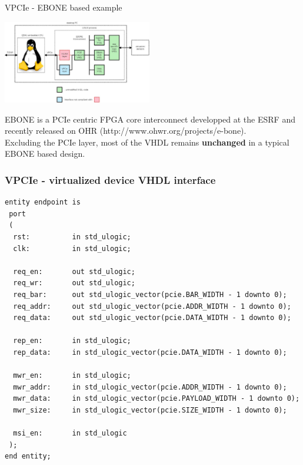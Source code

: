 \documentclass{beamer}
\begin{document}
\begin{frame}{VPCIe - EBONE based example}
  \begin{center}
    \includegraphics[width=65mm]{pic/dv_generic_platform_vpcie/main.jpeg}
  \end{center}
  \begin{tiny}
    EBONE is a PCIe centric FPGA core interconnect developped at the ESRF
    and recently released on OHR (http://www.ohwr.org/projects/e-bone).\\
    Excluding the PCIe layer, most of the VHDL remains \textbf{unchanged}
    in a typical EBONE based design.
  \end{tiny}
\end{frame}

\begin{frame}[containsverbatim]
 \frametitle{VPCIe - virtualized device VHDL interface}
 \begin{tiny}
 \lstset{language=VHDL}
 \begin{lstlisting}[frame=tb]
entity endpoint is
 port
 (
  rst:          in std_ulogic;
  clk:          in std_ulogic;

  req_en:       out std_ulogic;
  req_wr:       out std_ulogic;
  req_bar:      out std_ulogic_vector(pcie.BAR_WIDTH - 1 downto 0);
  req_addr:     out std_ulogic_vector(pcie.ADDR_WIDTH - 1 downto 0);
  req_data:     out std_ulogic_vector(pcie.DATA_WIDTH - 1 downto 0);

  rep_en:       in std_ulogic;
  rep_data:     in std_ulogic_vector(pcie.DATA_WIDTH - 1 downto 0);

  mwr_en:       in std_ulogic;
  mwr_addr:     in std_ulogic_vector(pcie.ADDR_WIDTH - 1 downto 0);
  mwr_data:     in std_ulogic_vector(pcie.PAYLOAD_WIDTH - 1 downto 0);
  mwr_size:     in std_ulogic_vector(pcie.SIZE_WIDTH - 1 downto 0);

  msi_en:       in std_ulogic
 );
end entity;
 \end{lstlisting}
 \end{tiny}
\end{frame}
\end{document}
